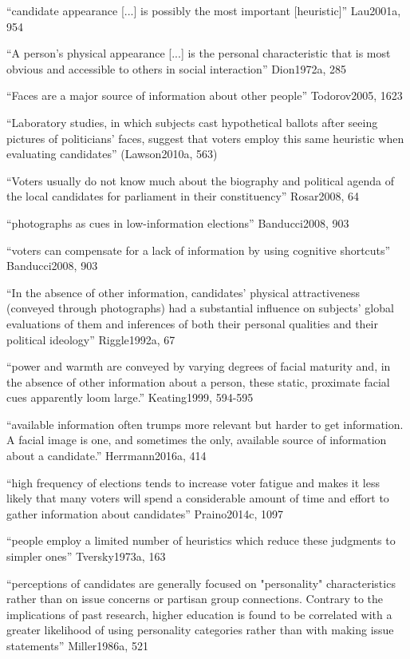 		``candidate appearance [...] is possibly the most important [heuristic]'' Lau2001a, 954

		``A person's physical appearance [...] is the personal characteristic that is most obvious and accessible to others in social interaction'' Dion1972a, 285

		``Faces are a major source of information about other people'' Todorov2005, 1623

		``Laboratory studies, in which subjects cast hypothetical ballots after seeing pictures of politicians' faces, suggest that voters employ this same heuristic when evaluating candidates'' (Lawson2010a, 563)

		``Voters usually do not know much about the biography and political agenda of the local candidates for parliament in their constituency'' Rosar2008, 64

		``photographs as cues in low-information elections'' Banducci2008, 903

		``voters can compensate for a lack of information by using cognitive shortcuts'' Banducci2008, 903

		``In the absence of other information, candidates' physical attractiveness (conveyed through photographs) had a substantial influence on subjects' global evaluations of them and inferences of both their personal qualities and their political ideology'' Riggle1992a, 67




		
		``power and warmth are conveyed by varying degrees of facial maturity and, in the absence of other information about a person, these static, proximate facial cues apparently loom large.'' Keating1999, 594-595

		``available information often trumps more relevant but harder to get information. A facial image is one, and sometimes the only, available source of information about a candidate.'' Herrmann2016a, 414

		``high frequency of elections tends to increase voter fatigue and makes it less likely that many voters will spend a considerable amount of time and effort to gather information about candidates'' Praino2014c, 1097

		``people employ a limited number of heuristics which reduce these judgments to simpler ones'' Tversky1973a, 163

		``perceptions of candidates are generally focused on "personality" characteristics rather than on issue concerns or partisan group connections. Contrary to the implications of past research, higher education is found to be correlated with a greater likelihood of using personality categories rather than with making issue statements'' Miller1986a, 521


